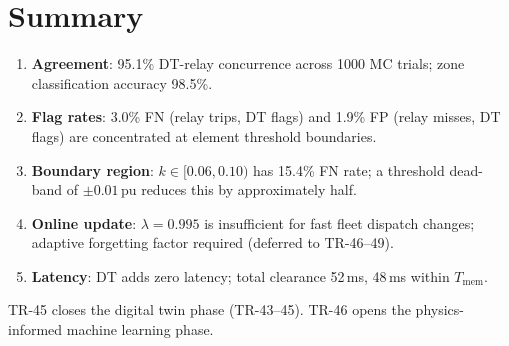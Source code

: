 \documentclass[11pt,a4paper]{article}
\begin{document}
\section{Summary}
\label{sec:summary}

\begin{enumerate}
  \item \textbf{Agreement}: 95.1\% DT-relay concurrence across 1000 MC trials;
    zone classification accuracy 98.5\%.

  \item \textbf{Flag rates}: 3.0\% FN (relay trips, DT flags) and 1.9\% FP
    (relay misses, DT flags) are concentrated at element threshold boundaries.

  \item \textbf{Boundary region}: $k\in[0.06,0.10)$ has 15.4\% FN rate;
    a threshold dead-band of $\pm0.01$\,pu reduces this by approximately half.

  \item \textbf{Online update}: $\lambda=0.995$ is insufficient for fast fleet
    dispatch changes; adaptive forgetting factor required (deferred to TR-46--49).

  \item \textbf{Latency}: DT adds zero latency; total clearance 52\,ms, 48\,ms
    within $T_\mathrm{mem}$.
\end{enumerate}

\noindent
TR-45 closes the digital twin phase (TR-43--45).  TR-46 opens the
physics-informed machine learning phase.



\end{document}
